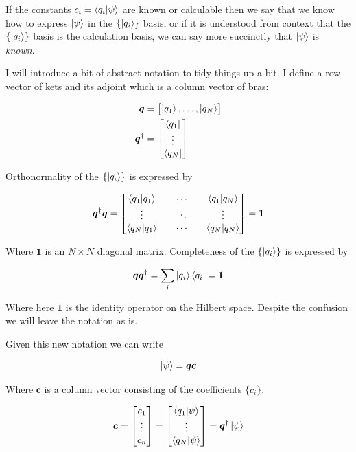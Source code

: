 \documentclass[12pt]{article}
\newcommand{\bv}[1]{\boldsymbol{#1}}
\begin{document}
If the constants $c_i = \braket{q_i|\psi}$ are known or calculable then we say that we know how to express $\ket{\psi}$ in the $\{\ket{q_i}\}$ basis, or if it is understood from context that the $\{\ket{q_i}\}$ basis is the calculation basis, we can say more succinctly that $\ket{\psi}$ is \textit{known}.

I will introduce a bit of abstract notation to tidy things up a bit. I define a row vector of kets and its adjoint which is a column vector of bras:

\begin{align}
\bv{q} &= \begin{bmatrix}\ket{q_1},\ldots,\ket{q_N}\end{bmatrix} \nonumber \\
\bv{q}^{\dag} &= \begin{bmatrix}\bra{q_1}\\\vdots\\\bra{q_N}\end{bmatrix}
\end{align}

Orthonormality of the $\{\ket{q_i}\}$ is expressed by

\begin{align}
\bv{q}^{\dag}\bv{q} = 
\begin{bmatrix}
\braket{q_1|q_1} && \cdots && \braket{q_1|q_N}\\
\vdots && \ddots && \vdots \\
\braket{q_N|q_1} && \cdots && \braket{q_N|q_N}
\end{bmatrix} = \bv{1}
\end{align}

Where $\bv{1}$ is an $N\times N$ diagonal matrix.
Completeness of the $\{\ket{q_i}\}$ is expressed by

\begin{align}
\bv{q}\bv{q}^{\dag} = \sum_i \ket{q_i}\bra{q_i} = \bv{1}
\end{align}

Where here $\bv{1}$ is the identity operator on the Hilbert space.
Despite the confusion we will leave the notation as is.

Given this new notation we can write

\begin{align}
\ket{\psi} = \bv{q}\bv{c}
\end{align}

Where $\bv{c}$ is a column vector consisting of the coefficients $\{c_i\}$.

\begin{align}
\bv{c} = \begin{bmatrix}
c_1\\ \vdots\\ c_n
\end{bmatrix} = 
\begin{bmatrix}
\braket{q_1|\psi}\\ \vdots \\ \braket{q_N|\psi} 
\end{bmatrix}
= \bv{q}^{\dag} \ket{\psi}
\end{align}
\end{document}
